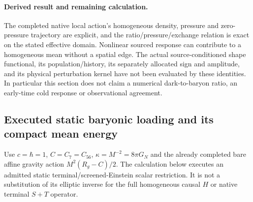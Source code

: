 \documentclass[12pt,a4paper]{article}
\begin{document}
\paragraph{Derived result and remaining calculation.}
The completed native local action's homogeneous density, pressure and
zero-pressure trajectory are explicit, and the ratio/pressure/exchange
relation is exact on the stated effective domain. Nonlinear sourced
response can contribute to a homogeneous mean without a spatial edge.
The actual source-conditioned shape functional, its population/history,
its separately allocated sign and amplitude, and its physical
perturbation kernel have not been evaluated by these identities.
In particular this section does not claim a numerical dark-to-baryon
ratio, an early-time cold response or observational agreement.


\subsection{Executed static baryonic loading and its compact mean energy}
\label{p8:sec:v2206-static-baryonic-mean}

Use $c=\hbar=1$, $C=C_7=C_{56}$, $\kappa=M^{-2}=8\pi G_N$ and the
already completed bare affine gravity action $M^2(R_g-C)/2$.
The calculation below executes an admitted static terminal/screened-Einstein
scalar restriction. It is not a substitution of its elliptic inverse for
the full homogeneous causal $H$ or native terminal $S+T$ operator.

\end{document}
